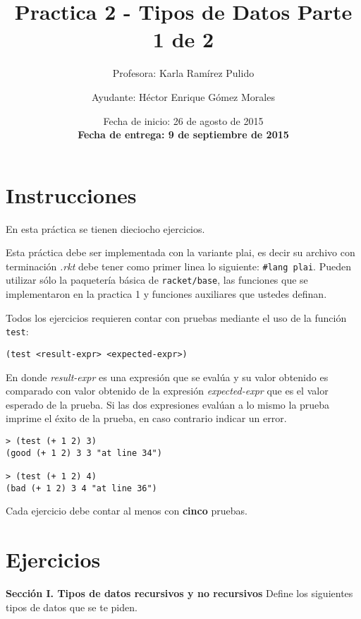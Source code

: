\documentclass{article}
\author{Profesora: Karla Ramírez Pulido \and
  Ayudante: Héctor Enrique Gómez Morales}
\title{Practica 2 - Tipos de Datos Parte 1 de 2}
\date{Fecha de inicio: 26 de agosto de 2015\\
  \textbf{Fecha de entrega: 9 de septiembre de 2015}}
\begin{document}
\maketitle
\section{Instrucciones}
En esta práctica se tienen dieciocho ejercicios.

Esta práctica debe ser implementada con la variante plai, es decir
su archivo con terminación \textit{.rkt} debe tener como primer linea lo siguiente:
\texttt{\#lang plai}. Pueden utilizar sólo la paquetería básica de
\texttt{racket/base}, las funciones que se implementaron en la
practica 1 y funciones auxiliares que ustedes definan.

Todos los ejercicios requieren contar con pruebas mediante el uso de
la función \texttt{test}:
\begin{verbatim}
(test <result-expr> <expected-expr>)
\end{verbatim}

En donde \textit{result-expr} es una expresión que se evalúa y su valor obtenido
es comparado con valor obtenido de la expresión \textit{expected-expr} que es el
valor esperado de la prueba. Si las dos expresiones evalúan a lo mismo la prueba
imprime el éxito de la prueba, en caso contrario indicar un error.

\begin{verbatim}
> (test (+ 1 2) 3)
(good (+ 1 2) 3 3 "at line 34")

> (test (+ 1 2) 4)
(bad (+ 1 2) 3 4 "at line 36")
\end{verbatim}

Cada ejercicio debe contar al menos con \textbf{cinco} pruebas.

\section{Ejercicios}
\textbf{Sección I. Tipos de datos recursivos y no recursivos} Define
los siguientes tipos de datos que se te piden.
\end{document}
